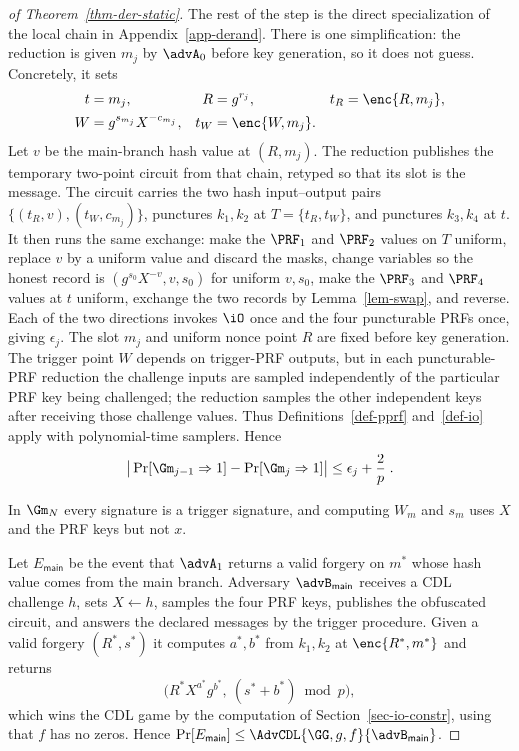 \begin{proof}[of Theorem~\ref{thm-der-static}]
The rest of the step is the direct specialization of the local chain in Appendix~\ref{app-derand}. There is one simplification: the reduction is given $m_j$ by $\advA_0$ before key generation, so it does not guess. Concretely, it sets
$$
\begin{aligned}
t&=m_j,&
R&=g^{r_j},&
t_R&=\enc{R,m_j},\\
W&=g^{s_{m_j}}X^{-c_{m_j}},&
t_W&=\enc{W,m_j}.
\end{aligned}
$$
Let $v$ be the main-branch hash value at $(R,m_j)$. The reduction publishes the temporary two-point circuit from that chain, retyped so that its slot is the message. The circuit carries the two hash input--output pairs $\{(t_R,v),(t_W,c_{m_j})\}$, punctures $k_1,k_2$ at $T=\{t_R,t_W\}$, and punctures $k_3,k_4$ at $t$. It then runs the same exchange: make the $\PRF_1$ and $\PRF_2$ values on $T$ uniform, replace $v$ by a uniform value and discard the masks, change variables so the honest record is $(g^{s_0}X^{-v},v,s_0)$ for uniform $v,s_0$, make the $\PRF_3$ and $\PRF_4$ values at $t$ uniform, exchange the two records by Lemma~\ref{lem-swap}, and reverse. Each of the two directions invokes $\iO$ once and the four puncturable PRFs once, giving $\epsilon_j$. The slot $m_j$ and uniform nonce point $R$ are fixed before key generation. The trigger point $W$ depends on trigger-PRF outputs, but in each puncturable-PRF reduction the challenge inputs are sampled independently of the particular PRF key being challenged; the reduction samples the other independent keys after receiving those challenge values. Thus Definitions~\ref{def-pprf} and~\ref{def-io} apply with polynomial-time samplers. Hence
$$
\big|\Pr[\Gm_{j-1}\Rightarrow1]-\Pr[\Gm_j\Rightarrow1]\big|
\le \epsilon_j+\frac{2}{p} \;.
$$

In $\Gm_N$ every signature is a trigger signature, and computing $W_{m}$ and $s_{m}$ uses $X$ and the PRF keys but not $x$.

 Let $E_{\mathsf{main}}$ be the event that $\advA_1$ returns a valid forgery on $m^*$ whose hash value comes from the main branch. Adversary $\advB_{\mathsf{main}}$ receives a CDL challenge $h$, sets $X\gets h$, samples the four PRF keys, publishes the obfuscated circuit, and answers the declared messages by the trigger procedure. Given a valid forgery $(R^*,s^*)$ it computes $a^*,b^*$ from $k_1,k_2$ at $\enc{R^*,m^*}$ and returns
$$
\big(R^*X^{a^*}g^{b^*},\ (s^*+b^*)\bmod p\big),
$$
which wins the CDL game by the computation of Section~\ref{sec-io-constr}, using that $f$ has no zeros. Hence $\Pr[E_{\mathsf{main}}]\le\AdvCDL{\GG,g,f}{\advB_{\mathsf{main}}}$.


\end{proof}
